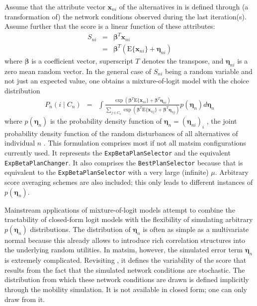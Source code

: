 Assume that the attribute vector $\mathbf{x}_{ni}$ of the alternatives in 
is defined through (a transformation of) the network conditions observed
during the last iteration(s). Assume further that the score is a linear
function of these attributes:
\begin{eqnarray}
S_{ni} & = & \boldsymbol{\beta}^{T}\mathbf{x}_{ni}\\
 & = & \boldsymbol{\beta}^{T}(\text{E}\{\mathbf{x}_{ni}\}+\boldsymbol{\eta}_{ni})\label{eq:score}
\end{eqnarray}
where $\boldsymbol{\beta}$ is a coefficient vector, superscript $T$ denotes the transpose,
and $\boldsymbol{\eta}_{ni}$ is a zero mean random vector. 
In the general case of $S_{ni}$ being a random
variable and not just an expected value, one obtains a mixture-of-logit
model with the choice distribution
\begin{eqnarray}
P_{n}(i\mid C_{n}) & = & 
\int\frac{\exp\left(\boldsymbol{\beta}^{T}\text{E}\{\mathbf{x}_{ni}\}+\boldsymbol{\beta}^{T}\boldsymbol{\eta}_{ni}\right)}
{\sum_{j\in C_{n}}\exp\left(\boldsymbol{\beta}^{T}\text{E}\{\mathbf{x}_{nj}\}+\boldsymbol{\beta}^{T}\boldsymbol{\eta}_{nj}\right)}
p(\boldsymbol{\eta}_{n})d\boldsymbol{\eta}_{n}\label{eq:mixture-of-logit}
\end{eqnarray}
where $p(\boldsymbol{\eta}_{n})$ is the probability density function of 
$\boldsymbol{\eta}_{n}=(\boldsymbol{\eta}_{ni})_i$ , \ie the joint probability
density function of the random disturbances of all alternatives of individual $n$
\citep{Train_2003}. This formulation comprises most if not all \gls{matsim}
configurations currently used. It represents the \lstinline{ExpBetaPlanSelector}
and the equivalent \lstinline{ExpBetaPlanChanger}. It also comprises
the \lstinline{BestPlanSelector} because that is equivalent to the \lstinline{ExpBetaPlanSelector}
with a very large (infinite) $\mu$. Arbitrary score averaging schemes
are also included; this only leads to different instances of $p(\boldsymbol{\eta}_{n})$.

Mainstream applications of mixture-of-logit models attempt to combine
the tractability of closed-form logit models with the flexibility of
simulating arbitrary $p(\boldsymbol{\eta}_n)$ distributions.
The distribution of $\boldsymbol{\eta}_n$ is often as simple as a multivariate normal
because this already allows to introduce rich correlation structures
into the underlying random utilities. In \gls{matsim}, however, the simulated
error term $\boldsymbol{\eta}_n$ is extremely complicated. Revisiting ,
it defines the variability of the score that results from the fact
that the simulated network conditions are stochastic. The distribution
from which these network conditions are drawn is defined implicitly
through the mobility simulation. It is not available in closed form;
one can only draw from it.


